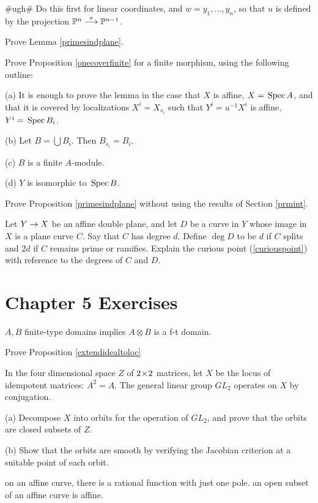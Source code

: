\documentclass[leqno]{book}
\newcommand\Marginnote[1]{\marginnote{\hspace{-12pt}\normalfont{#1}}}
\theoremstyle{definition}%
\numberwithin{equation}{section}
\theoremstyle{theorem} %
\begin{document}
\#ugh\# Do this first for linear coordinates, and $w = y_1,...,y_n$,
so that $u$ is defined by the projection $\mathbb{P}^n
\stackrel\pi\longrightarrow \mathbb{P}^{n-1}$.

\bs
Prove Lemma \ref{primesindplane}.

\bs
Prove Proposition \ref{onecoverfinite} for a finite morphism,
using the following outline:

\no
(a) It is enough to prove the lemma in the case that $X$ is affine,
$X= \,\operatorname{Spec} A$, and that it is covered by localizations $X^i=X_{s_i}$
such that $Y^i = u^{-1}X^i$ is affine, $Y^i = \,\operatorname{Spec} B_i$.

\no
(b) Let $B = \bigcup B_i$.  Then $B_{s_i} = B_i$.  


\no (c) $B$ is a finite $A$-module.


\no(d) $Y$ is isomorphic to $\,\operatorname{Spec} B$.


\bs
Prove
 Proposition \ref{primesindplane} without using the results of Section 
\ref{prmint}.


\bs
Let $Y\rightarrow
X$ be an affine double plane, and let $D$ be a curve in $Y$ whose
image in $X$ is a plane curve $C$.  Say that $C$ has degree $d$.
Define $\deg D$ to be $d$ if $C$ splits and $2d$ if $C$ remains prime
or ramifies.  Explain the curious point (\ref{curiouspoint}) with
reference to the degrees of $C$ and $D$.

\newpage

\section{Chapter 5 Exercises}\Marginnote{exchapfive}\label{exchapfive}


\bs
$A,B$ finite-type domains implies $A\otimes B$ is a f-t domain.


\ms
Prove Proposition \ref{extendidealtoloc} 


\ms In the four dimensional space $Z$  of $2\!\times \! 2$ matrices, let $X$ be
the locus of idempotent matrices: $A^2=A$.  The general linear group
$GL_2$ operates on $X$ by conjugation.

(a) Decompose $X$ into orbits for the operation of $GL_2$, and prove
that the orbits are closed subsets of $Z$.

(b) Show that the orbits are smooth by verifying the Jacobian
criterion at a suitable point of each orbit.



  \ms on an affine curve, there
is a rational function with just one pole.  an open subset of an
affine curve is affine.
\end{document}
